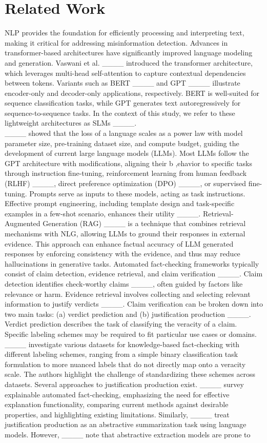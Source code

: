 \section{Related Work}
NLP provides the foundation for efficiently processing and interpreting text, making it critical for addressing misinformation detection. Advances in transformer-based architectures have significantly improved language modeling and generation. Vaswani et al. ____ introduced the transformer architecture, which leverages multi-head self-attention to capture contextual dependencies between tokens. Variants such as BERT ____ and GPT ____ illustrate encoder-only and decoder-only applications, respectively. BERT is well-suited for sequence classification tasks, while GPT generates text autoregressively for sequence-to-sequence tasks. In the context of this study, we refer to these lightweight architectures as SLMs ____. \\____ showed that the loss of a language scales as a power law with model parameter size, pre-training dataset size, and compute budget, guiding the development of current large language models (LLMs). Most LLMs follow the GPT architecture with modifications, aligning their b ,ehavior to specific tasks through instruction fine-tuning, reinforcement learning from human feedback (RLHF) ____, direct preference optimization (DPO) ____, or supervised fine-tuning. Prompts serve as inputs to these models, acting as task instructions. Effective prompt engineering, including template design and task-specific examples in a few-shot scenario, enhances their utility ____. Retrieval-Augmented Generation (RAG) ____ is a technique that combines retrieval mechanisms with NLG, allowing LLMs to ground their responses in external evidence. This approach can enhance factual accuracy of LLM generated responses by enforcing consistency with the evidence, and thus may reduce hallucinations in generative tasks. Automated fact-checking frameworks typically consist of claim detection, evidence retrieval, and claim verification ____. Claim detection identifies check-worthy claims ____, often guided by factors like relevance or harm. Evidence retrieval involves collecting and selecting relevant information to justify verdicts ____. Claim verification can be broken down into two main tasks: (a) verdict prediction and (b) justification production ____. Verdict prediction describes the task of classifying the veracity of a claim. Specific labeling schemes may be required to fit particular use cases or domains. ____ investigate various datasets for knowledge-based fact-checking with different labeling schemes, ranging from a simple binary classification task formulation to more nuanced labels that do not directly map onto a veracity scale. The authors highlight the challenge of standardizing these schemes across datasets. Several approaches to justification production exist. ____ survey explainable automated fact-checking, emphasizing the need for effective explanation functionality, comparing current methods against desirable properties, and highlighting existing limitations. Similarly, ____ treat justification production as an abstractive summarization task using language models. However, ____ note that abstractive extraction models are prone to 